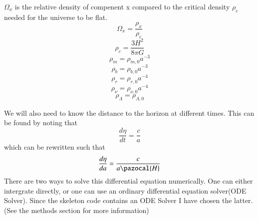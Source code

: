 \documentclass{aa}   %
\begin{document}
$\Omega_x$ is the relative density of compenent x compared to the critical density $\rho_c$ needed for the universe to be flat.
\begin{equation}
 \Omega_x = \frac{\rho_x}{\rho_c}
\end{equation}
\begin{equation}
 \rho_c = \frac{3H^2}{8\pi G}
\end{equation}
\begin{equation}
 \rho_m = \rho_{m,0}a^{-3}
\end{equation}
\begin{equation}
 \rho_b = \rho_{b,0}a^{-3}
\end{equation}
\begin{equation}
 \rho_r = \rho_{r,0}a^{-4}
\end{equation}
\begin{equation}
 \rho_\nu = \rho_{\nu,0}a^{-4}
\end{equation}
\begin{equation}
 \rho_\Lambda = \rho_{\Lambda,0}
\end{equation}

We will also need to know the distance to the horizon at different times. This can be found by noting that
\begin{equation*}
 \frac{d\eta}{dt} = \frac{c}{a}
\end{equation*}
which can be rewritten such that
\begin{equation}
 \frac{d\eta}{da} = \frac{c}{a \pazocal{H}}
\end{equation}
There are two ways to solve this differential equation numerically. One can either intergrate directly, or one can use an ordinary differential equation solver(ODE Solver). Since the skeleton code contains an ODE Solver I have chosen the latter. (See the methods section for more information)


\end{document}

